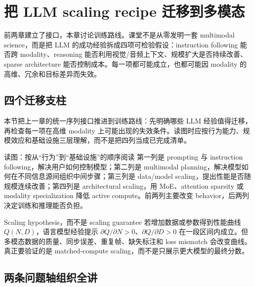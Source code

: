 \section{把 LLM scaling recipe 迁移到多模态}

前两章建立了接口，本章讨论训练路线。课堂不是从零发明一套 multimodal science，而是把 LLM 的成功经验拆成四项可检验假设：instruction following 能否跨 modality、reasoning 能否利用视觉/音频上下文、规模扩大是否持续改善、sparse architecture 能否控制成本。每一项都可能成立，也都可能因 modality 的高维、冗余和目标差异而失效。

\subsection{四个迁移支柱}

本节把上一章的统一序列接口推进到训练路线：先明确哪些 LLM 经验值得迁移，再检查每一项在高维 modality 上可能出现的失效条件。读图时应按行为能力、规模效应和基础设施三层理解，而不是把四列当成已完成清单。


\begin{knowledgebox}{读图：按从“行为”到“基础设施”的顺序阅读}
第一列是 prompting 与 instruction following，解决用户如何控制模型；第二列是 multimodal planning，解决模型如何在不同信息源间组织中间步骤；第三列是 data/model scaling，提出性能是否随规模连续改善；第四列是 architectural scaling，用 MoE、attention sparsity 或 modality specialization 降低 active compute。前两列主要改变 behavior，后两列决定训练和推理能否负担。
\end{knowledgebox}

\begin{importantbox}{Scaling hypothesis，而不是 scaling guarantee}
若增加数据或参数得到性能曲线 $Q(N,D)$，语言模型经验提示 $\partial Q/\partial N>0$、$\partial Q/\partial D>0$ 在一段区间内成立。但多模态数据的质量、同步误差、重复帧、缺失标注和 loss mismatch 会改变曲线。真正要验证的是 matched-compute scaling，而不是只展示更大模型的最终分数。
\end{importantbox}


\subsection{两条问题轴组织全讲}

